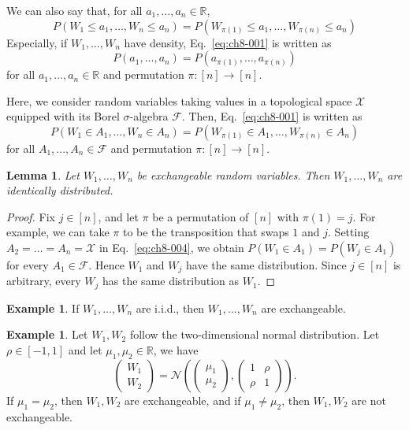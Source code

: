\documentclass[a4paper,12pt]{article}
\numberwithin{equation}{section}
\theoremstyle{plain}
\newtheorem{lemma}[theorem]{Lemma}
\theoremstyle{definition}
\newtheorem{example}[theorem]{Example}
\theoremstyle{remark}
\begin{document}
We can also say that, for all $a_1,\dots,a_n\in\mathbb{R}$,
\begin{equation}
    P(W_1\leq a_1,\dots,W_n\leq a_n)=P(W_{\pi(1)}\leq a_1,\dots,W_{\pi(n)}\leq a_n)
    \label{eq:ch8-002}
\end{equation}
Especially, if $W_1,\dots,W_n$ have density, Eq.~\eqref{eq:ch8-001} is written as
\begin{equation}
    P(a_1,\dots,a_n)=P(a_{\pi(1)},\dots,a_{\pi(n)})
    \label{eq:ch8-003}
\end{equation}
for all $a_1,\dots,a_n\in\mathbb{R}$ and permutation $\pi:[n]\to[n]$.

Here, we consider random variables taking values in a topological space $\mathcal{X}$ equipped with its Borel $\sigma$-algebra $\mathcal{F}$. Then, Eq.~\eqref{eq:ch8-001} is written as 
\begin{equation}
    P(W_1\in A_1,\dots,W_n\in A_n)=P(W_{\pi(1)}\in A_1,\dots,W_{\pi(n)}\in A_n)
    \label{eq:ch8-004}
\end{equation}
for all $A_1,...,A_n\in\mathcal{F}$ and permutation $\pi:[n]\to[n]$.

\begin{lemma}
\label{lemma:ch8-02}
    Let $W_1,\dots,W_n$ be exchangeable random variables. Then $W_1,\dots,W_n$ are identically distributed.
\end{lemma}
\begin{proof}
    Fix $j\in[n]$, and let $\pi$ be a permutation of $[n]$ with $\pi(1)=j$. For example, we can take $\pi$ to be the transposition that swaps $1$ and $j$. Setting $A_2=\dots=A_n=\mathcal{X}$ in Eq.~\eqref{eq:ch8-004}, we obtain $P(W_1\in A_1)=P(W_j\in A_1)$ for every $A_1\in\mathcal{F}$. Hence $W_1$ and $W_j$ have the same distribution. Since $j\in[n]$ is arbitrary, every $W_j$ has the same distribution as $W_1$.
\end{proof}

\begin{example}
\label{example:ch8-03}
    If $W_1,\dots,W_n$ are i.i.d., then $W_1,\dots,W_n$ are exchangeable.
\end{example}

\begin{example}
\label{example:ch8-04}
    Let $W_1,W_2$ follow the two-dimensional normal distribution. Let $\rho\in [-1,1]$ and let $\mu_1,\mu_2\in\mathbb{R}$, we have
    \[
    \begin{pmatrix}
        W_1\\W_2
    \end{pmatrix}=
    \mathcal{N}\left(
        \begin{pmatrix}
            \mu_1\\\mu_2
        \end{pmatrix},
        \begin{pmatrix}
            1 & \rho \\\rho & 1
        \end{pmatrix}
    \right).
    \]
    If $\mu_1=\mu_2$, then $W_1,W_2$ are exchangeable, and if $\mu_1\neq\mu_2$, then $W_1,W_2$ are not exchangeable. 
\end{example}
\end{document}

